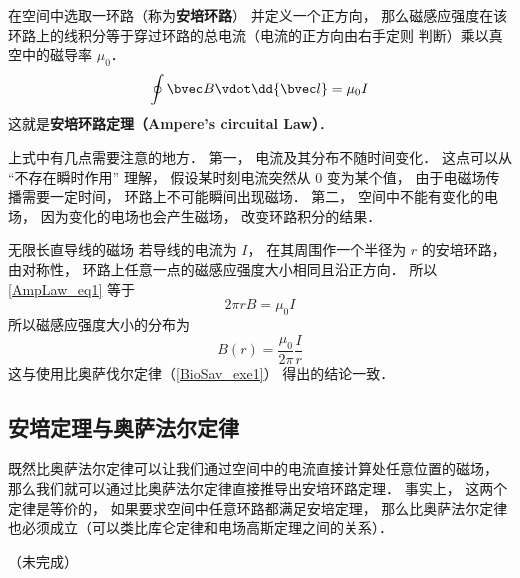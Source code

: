 
在空间中选取一环路（称为\textbf{安培环路}） 并定义一个正方向， 那么磁感应强度在该环路上的线积分等于穿过环路的总电流（电流的正方向由右手定则 判断）乘以真空中的磁导率 $\mu_0$．
\begin{equation}\label{AmpLaw_eq1}
\oint \bvec B \vdot \dd{\bvec l} = \mu_0 I
\end{equation}
这就是\textbf{安培环路定理（Ampere's circuital Law）}．

上式中有几点需要注意的地方． 第一， 电流及其分布不随时间变化． 这点可以从 “不存在瞬时作用” 理解， 假设某时刻电流突然从 0 变为某个值， 由于电磁场传播需要一定时间， 环路上不可能瞬间出现磁场． 第二， 空间中不能有变化的电场， 因为变化的电场也会产生磁场， 改变环路积分的结果．%

\begin{example}{无限长直导线的磁场}\label{AmpLaw_ex1}
若导线的电流为 $I$， 在其周围作一个半径为 $r$ 的安培环路， 由对称性， 环路上任意一点的磁感应强度大小相同且沿正方向． 所以\autoref{AmpLaw_eq1} 等于
\begin{equation}
2\pi r B = \mu_0 I
\end{equation}
所以磁感应强度大小的分布为
\begin{equation}
B(r) = \frac{\mu_0}{2\pi} \frac Ir
\end{equation}
这与使用比奥萨伐尔定律（\autoref{BioSav_exe1}） 得出的结论一致．
\end{example}


\subsection{安培定理与奥萨法尔定律}
既然比奥萨法尔定律可以让我们通过空间中的电流直接计算处任意位置的磁场， 那么我们就可以通过比奥萨法尔定律直接推导出安培环路定理． 事实上， 这两个定律是等价的， 如果要求空间中任意环路都满足安培定理， 那么比奥萨法尔定律也必须成立（可以类比库仑定律和电场高斯定理之间的关系）．%


（未完成）

